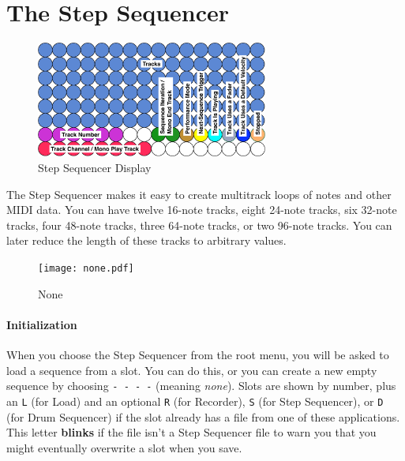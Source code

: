 \documentclass{article}
\begin{document}
\clearpage


\section {The Step Sequencer}
\label{stepsequencersec}

\vspace{1em}

\begin{figure}
\vspace{-4.75em}\includegraphics[width=3in]{stepsequencer}
\vspace{-2em}\caption{\small Step Sequencer Display}
\vspace{-1em}
\label{stepsequencer}
\end{figure}

The Step Sequencer makes it easy to create multitrack loops of notes and other MIDI data.  You can have twelve 16-note tracks, eight 24-note tracks, six 32-note tracks, four 48-note tracks, three 64-note tracks, or two 96-note tracks.  You can later reduce the length of these tracks to arbitrary values.

\begin{figure}
\vspace{-1em}\texttt{[image: none.pdf]}
\vspace{-1em}\caption{\small None}\vspace{-2em}
\label{none}
\end{figure}

\paragraph{Initialization} When you choose the Step Sequencer from the root menu, you will be asked to load a sequence from a slot.  You can do this, or you can create a new empty sequence by choosing \texttt{-~-~-~-} (meaning {\it none}).  Slots are shown by number, plus an \texttt{L} (for Load) and an optional \texttt{R} (for Recorder), \texttt{S} (for Step Sequencer), or \texttt{D} (for Drum Sequencer) if the slot already has a file from one of these applications.  This letter {\bf blinks} if the file isn't a Step Sequencer file to warn you that you might eventually overwrite a slot when you save.
\end{document}
